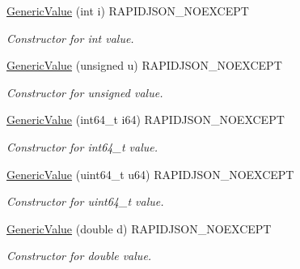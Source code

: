 \begin{DoxyCompactItemize}
\hyperlink{class_generic_value_aafc754ade38421c179f5c8933ecbaf45}{Generic\+Value} (int i) R\+A\+P\+I\+D\+J\+S\+O\+N\+\_\+\+N\+O\+E\+X\+C\+E\+PT
\begin{DoxyCompactList}\small\item\em Constructor for int value. \end{DoxyCompactList}\item 
\mbox{\label{class_generic_value_a972bff6c56ac3d04622ff7fad8d98331}} 
\hyperlink{class_generic_value_a972bff6c56ac3d04622ff7fad8d98331}{Generic\+Value} (unsigned u) R\+A\+P\+I\+D\+J\+S\+O\+N\+\_\+\+N\+O\+E\+X\+C\+E\+PT
\begin{DoxyCompactList}\small\item\em Constructor for unsigned value. \end{DoxyCompactList}\item 
\mbox{\label{class_generic_value_a964b69f1d2596f75ded5421b6db01a14}} 
\hyperlink{class_generic_value_a964b69f1d2596f75ded5421b6db01a14}{Generic\+Value} (int64\+\_\+t i64) R\+A\+P\+I\+D\+J\+S\+O\+N\+\_\+\+N\+O\+E\+X\+C\+E\+PT
\begin{DoxyCompactList}\small\item\em Constructor for int64\+\_\+t value. \end{DoxyCompactList}\item 
\mbox{\label{class_generic_value_ad04805a57f5050c8e04be469ba64d6f3}} 
\hyperlink{class_generic_value_ad04805a57f5050c8e04be469ba64d6f3}{Generic\+Value} (uint64\+\_\+t u64) R\+A\+P\+I\+D\+J\+S\+O\+N\+\_\+\+N\+O\+E\+X\+C\+E\+PT
\begin{DoxyCompactList}\small\item\em Constructor for uint64\+\_\+t value. \end{DoxyCompactList}\item 
\mbox{\label{class_generic_value_a267d05b7e98c3507908eaf085fe41155}} 
\hyperlink{class_generic_value_a267d05b7e98c3507908eaf085fe41155}{Generic\+Value} (double d) R\+A\+P\+I\+D\+J\+S\+O\+N\+\_\+\+N\+O\+E\+X\+C\+E\+PT
\begin{DoxyCompactList}\small\item\em Constructor for double value. \end{DoxyCompactList}\item 
\mbox{\label{class_generic_value_acad11ab781251634a3c079aa64a6d283}} 

\end{DoxyCompactItemize}

